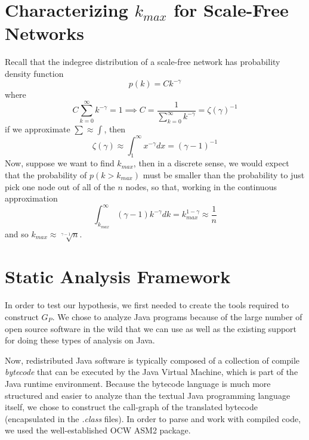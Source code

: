 \documentclass[11pt,a4paper]{article}
\newcommand{\pa}[1]{\left(#1\right)}
\begin{document}
\section*{Characterizing $k_{max}$ for Scale-Free Networks}
Recall that the indegree distribution of a scale-free network has probability 
density function
$$
p(k) = C k^{-\gamma}
$$
where 
$$
C \sum_{k=0}^\infty k^{-\gamma} = 1 \implies 
C = \frac{1}{\sum\limits_{k=0}^\infty k^{-\gamma}} = \zeta(\gamma)^{-1}
$$
if we approximate $\sum \approx \int$, then
$$
\zeta(\gamma) \approx \int_1^\infty x^{-\gamma} dx = \pa{\gamma-1}^{-1}
$$
Now, suppose we want to find $k_{max}$, then in a discrete sense, we would 
expect that the probability of $p(k > k_{max})$ must be smaller than the 
probability to just pick one node out of all of the $n$ nodes, so that, 
working in the continuous approximation
$$
\int_{k_{max}}^\infty (\gamma -1)k^{-\gamma} dk = k_{max}^{1-\gamma} \approx 
\frac{1}{n}
$$
and so $k_{max} \approx \sqrt[\gamma - 1]{n}$. \cite{CLASS}

\section*{Static Analysis Framework}
In order to test our hypothesis, we first needed to create the tools required 
to construct $G_P$. We chose to analyze Java programs because of the large 
number of open source software in the wild that we can use as well as the 
existing support for doing these types of analysis on Java. 

Now, redistributed Java software is typically composed of a collection of 
compile \emph{bytecode} that can be executed by the Java Virtual Machine, 
which is part of the Java runtime environment. Because the bytecode language 
is much more structured and easier to analyze than the textual Java 
programming language itself, we chose to construct the call-graph of the 
translated bytecode (encapsulated in the \emph{.class} files). In order to 
parse and work with compiled code, we used the well-established OCW ASM2 
package. \cite{ocwasm} 
\end{document}
